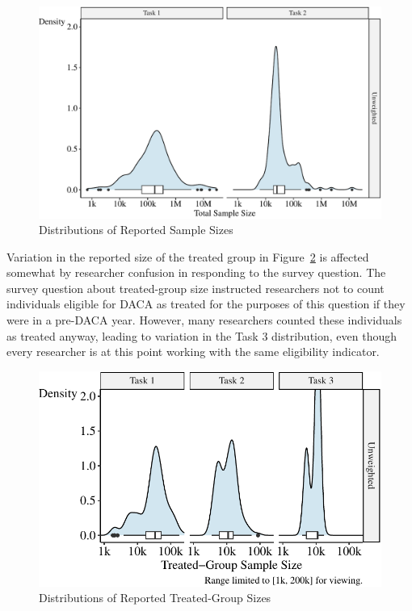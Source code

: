 \documentclass[
  letterpaper,
  DIV=11,
  numbers=noendperiod]{scrartcl}
\begin{document}
\begin{figure}

{\centering \includegraphics{The-Sources-of-Researcher-Variation-in-Economics_files/figure-pdf/fig-sample-size-distributions-1.pdf}

}

\caption{\label{fig-sample-size-distributions}Distributions of Reported
Sample Sizes}

\end{figure}

Variation in the reported size of the treated group in
Figure~\ref{fig-treated-group-distributions} is affected somewhat by
researcher confusion in responding to the survey question. The survey
question about treated-group size instructed researchers not to count
individuals eligible for DACA as treated for the purposes of this
question if they were in a pre-DACA year. However, many researchers
counted these individuals as treated anyway, leading to variation in the
Task 3 distribution, even though every researcher is at this point
working with the same eligibility indicator.

\begin{figure}

{\centering \includegraphics{The-Sources-of-Researcher-Variation-in-Economics_files/figure-pdf/fig-treated-group-distributions-1.pdf}

}

\caption{\label{fig-treated-group-distributions}Distributions of
Reported Treated-Group Sizes}

\end{figure}
\end{document}
